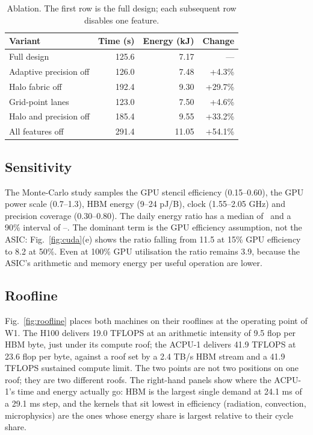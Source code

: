 \begin{table}[t]
\centering\small
\caption{Ablation. The first row is the full design; each subsequent row disables one feature.}
\label{tab:ablation}
\begin{tabular}{@{}lrrr@{}}
\toprule
Variant & Time (s) & Energy (kJ) & Change\\
\midrule
Full design & 125.6 & 7.17 & ---\\
Adaptive precision off & 126.0 & 7.48 & +4.3\%\\
Halo fabric off & 192.4 & 9.30 & +29.7\%\\
Grid-point lanes & 123.0 & 7.50 & +4.6\%\\
Halo and precision off & 185.4 & 9.55 & +33.2\%\\
All features off & 291.4 & 11.05 & +54.1\%\\
\bottomrule
\end{tabular}
\end{table}

\subsection{Sensitivity}\label{sec:sensitivity}
The Monte-Carlo study samples the GPU stencil efficiency (0.15--0.60), the GPU power scale
(0.7--1.3), HBM energy (9--24 pJ/B), clock (1.55--2.05 GHz) and precision coverage (0.30--0.80).
The daily energy ratio has a median of \ACRatioDay\ and a 90\% interval of
\ACRatioDayLo--\ACRatioDayHi. The dominant term is the GPU efficiency assumption, not the ASIC:
Fig.~\ref{fig:cuda}(e) shows the ratio falling from 11.5 at 15\% GPU efficiency to 8.2 at 50\%.
Even at 100\% GPU utilisation the ratio remains 3.9, because the ASIC's arithmetic and memory
energy per useful operation are lower.

\subsection{Roofline}
Fig.~\ref{fig:roofline} places both machines on their rooflines at the operating point of W1.
The H100 delivers 19.0 TFLOPS at an arithmetic intensity of 9.5 flop per HBM byte, just under its
compute roof; the ACPU-1 delivers 41.9 TFLOPS at 23.6 flop per byte, against a roof set by a
2.4 TB/s HBM stream and a 41.9 TFLOPS sustained compute limit. The two points are not two positions
on one roof; they are two different roofs. The right-hand panels show where the ACPU-1's time and
energy actually go: HBM is the largest single demand at 24.1 ms of a 29.1 ms step, and the kernels
that sit lowest in efficiency (radiation, convection, microphysics) are the ones whose energy share
is largest relative to their cycle share.

